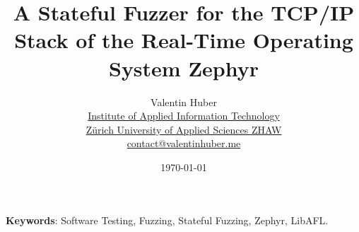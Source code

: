 \documentclass{article}
\title{%
\vspace{50px}%
    \Huge A Stateful Fuzzer for the TCP/IP Stack of the Real-Time Operating System Zephyr
    \vspace{250px}%
}
\author{%
  Valentin Huber\vspace{5px}\\%
  \small \href{https://www.zhaw.ch/en/engineering/institutes-centres/init/}{Institute of Applied Information Technology}\\%
  \small \href{https://www.zhaw.ch/en}{Zürich University of Applied Sciences ZHAW}\\%
  \small \href{mailto://contact@valentinhuber.me}{contact@valentinhuber.me}%
  \vspace{10px}
}
\date{\today\vspace{5px}}
\begin{document}
\maketitle

\clearpage\newpage
\begin{center}
    \begin{minipage}{0.8\textwidth}
        \vspace{70px}

        \begin{abstract}
            \lipsum[1]\lipsum[2]\lipsum[3]
        \end{abstract}
    \end{minipage}

    \vspace{70px}

    \begin{minipage}{0.7\textwidth}
        \textbf{Keywords}: Software Testing, Fuzzing, Stateful Fuzzing, Zephyr, LibAFL.
    \end{minipage}
\end{center}

\clearpage\newpage
{}
\tableofcontents
\clearpage\newpage
\end{document}
